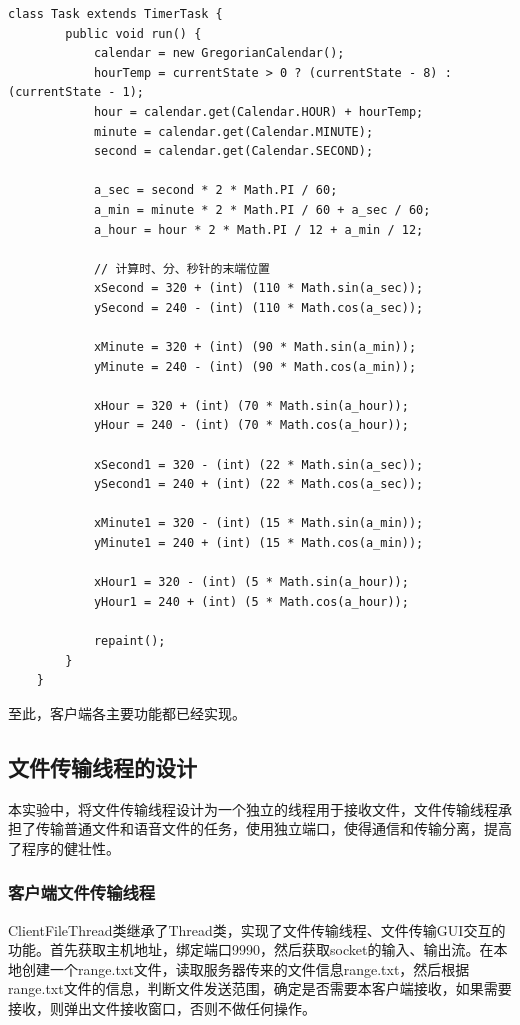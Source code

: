 \documentclass[UTF8,12pt]{article}
\begin{document}
\begin{lstlisting}[title=系统时间的获取,frame=shadowbox]
    class Task extends TimerTask {
        public void run() {
            calendar = new GregorianCalendar();
            hourTemp = currentState > 0 ? (currentState - 8) : (currentState - 1);
            hour = calendar.get(Calendar.HOUR) + hourTemp;
            minute = calendar.get(Calendar.MINUTE);
            second = calendar.get(Calendar.SECOND);

            a_sec = second * 2 * Math.PI / 60;
            a_min = minute * 2 * Math.PI / 60 + a_sec / 60;
            a_hour = hour * 2 * Math.PI / 12 + a_min / 12;

            // 计算时、分、秒针的末端位置
            xSecond = 320 + (int) (110 * Math.sin(a_sec));
            ySecond = 240 - (int) (110 * Math.cos(a_sec));

            xMinute = 320 + (int) (90 * Math.sin(a_min));
            yMinute = 240 - (int) (90 * Math.cos(a_min));

            xHour = 320 + (int) (70 * Math.sin(a_hour));
            yHour = 240 - (int) (70 * Math.cos(a_hour));

            xSecond1 = 320 - (int) (22 * Math.sin(a_sec));
            ySecond1 = 240 + (int) (22 * Math.cos(a_sec));

            xMinute1 = 320 - (int) (15 * Math.sin(a_min));
            yMinute1 = 240 + (int) (15 * Math.cos(a_min));

            xHour1 = 320 - (int) (5 * Math.sin(a_hour));
            yHour1 = 240 + (int) (5 * Math.cos(a_hour));

            repaint();
        }
    }
\end{lstlisting}

至此，客户端各主要功能都已经实现。

\subsection{文件传输线程的设计}
本实验中，将文件传输线程设计为一个独立的线程用于接收文件，文件传输线程承担了传输普通文件和语音文件的任务，使用独立端口，使得通信和传输分离，提高了程序的健壮性。

\subsubsection{客户端文件传输线程}
ClientFileThread类继承了Thread类，实现了文件传输线程、文件传输GUI交互的功能。首先获取主机地址，绑定端口9990，然后获取socket的输入、输出流。在本地创建一个range.txt文件，读取服务器传来的文件信息range.txt，然后根据range.txt文件的信息，判断文件发送范围，确定是否需要本客户端接收，如果需要接收，则弹出文件接收窗口，否则不做任何操作。
\end{document}
